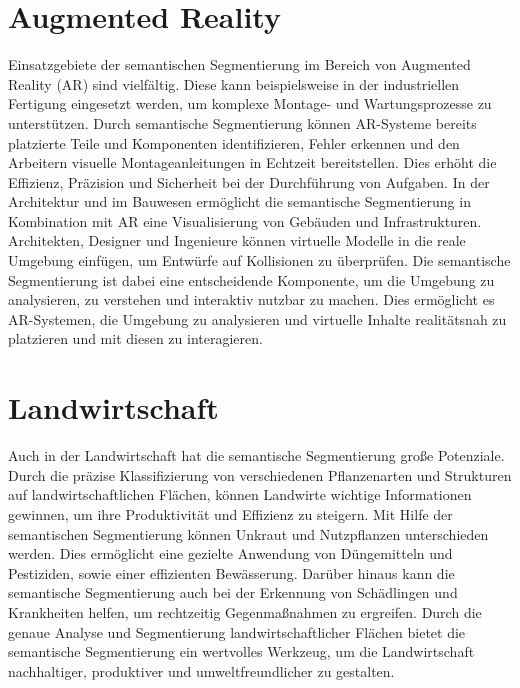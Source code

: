 \section{Augmented Reality}
Einsatzgebiete der semantischen Segmentierung im Bereich von Augmented Reality
(AR) sind vielfältig. Diese kann beispielsweise in der industriellen Fertigung
eingesetzt werden, um komplexe Montage- und Wartungsprozesse zu unterstützen.
Durch semantische Segmentierung können AR-Systeme bereits platzierte Teile und
Komponenten identifizieren, Fehler erkennen und den Arbeitern visuelle
Montageanleitungen in Echtzeit bereitstellen. Dies erhöht die Effizienz,
Präzision und Sicherheit bei der Durchführung von Aufgaben. In der Architektur
und im Bauwesen ermöglicht die semantische Segmentierung in Kombination mit AR
eine Visualisierung von Gebäuden und Infrastrukturen. Architekten, Designer und
Ingenieure können virtuelle Modelle in die reale Umgebung einfügen, um Entwürfe
auf Kollisionen zu überprüfen. Die semantische Segmentierung ist dabei eine
entscheidende Komponente, um die Umgebung zu analysieren, zu verstehen und
interaktiv nutzbar zu machen. Dies ermöglicht es AR-Systemen, die Umgebung zu
analysieren und virtuelle Inhalte realitätsnah zu platzieren und mit diesen zu
interagieren. \cite{nee2012augmented,ko2020novel}

\section{Landwirtschaft}

Auch in der Landwirtschaft hat die semantische Segmentierung große Potenziale.
Durch die präzise Klassifizierung von verschiedenen Pflanzenarten und
Strukturen auf landwirtschaftlichen Flächen, können Landwirte wichtige
Informationen gewinnen, um ihre Produktivität und Effizienz zu steigern. Mit
Hilfe der semantischen Segmentierung können Unkraut und Nutzpflanzen
unterschieden werden. Dies ermöglicht eine gezielte Anwendung von Düngemitteln
und Pestiziden, sowie einer effizienten Bewässerung. Darüber hinaus kann die
semantische Segmentierung auch bei der Erkennung von Schädlingen und
Krankheiten helfen, um rechtzeitig Gegenmaßnahmen zu ergreifen. Durch die
genaue Analyse und Segmentierung landwirtschaftlicher Flächen bietet die
semantische Segmentierung ein wertvolles Werkzeug, um die Landwirtschaft
nachhaltiger, produktiver und umweltfreundlicher zu gestalten. \cite{8460962}

